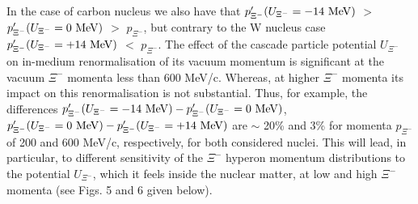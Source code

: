 \documentclass[12pt]{article}
\begin{document}
In the case of carbon nucleus we also have that
$p^{\prime}_{\Xi^-}(U_{\Xi^-}=-14~{\rm MeV})$ $>$ $p^{\prime}_{\Xi^-}(U_{\Xi^-}=0~{\rm MeV})$ $>$ $p_{\Xi^-}$,
but contrary to the W nucleus case $p^{\prime}_{\Xi^-}(U_{\Xi^-}=+14~{\rm MeV})$ $<$ $p_{\Xi^-}$. The effect of the
cascade particle potential $U_{\Xi^-}$ on in-medium renormalisation of its vacuum momentum is significant at the
vacuum $\Xi^-$ momenta less than 600 MeV/c. Whereas, at higher $\Xi^-$ momenta its impact on this renormalisation
is not substantial. Thus, for example, the differences
$p^{\prime}_{\Xi^-}(U_{\Xi^-}=-14~{\rm MeV})-p^{\prime}_{\Xi^-}(U_{\Xi^-}=0~{\rm MeV})$,
$p^{\prime}_{\Xi^-}(U_{\Xi^-}=0~{\rm MeV})-p^{\prime}_{\Xi^-}(U_{\Xi^-}=+14~{\rm MeV})$ are $\sim$ 20\% and 3\%
for momenta $p_{\Xi^-}$ of 200 and 600 MeV/c, respectively, for both considered nuclei. This will lead, in particular,
to different sensitivity of the $\Xi^-$ hyperon momentum distributions to the potential $U_{\Xi^-}$, which it feels
inside the nuclear matter, at low and high $\Xi^-$ momenta (see Figs. 5 and 6 given below).
\end{document}
